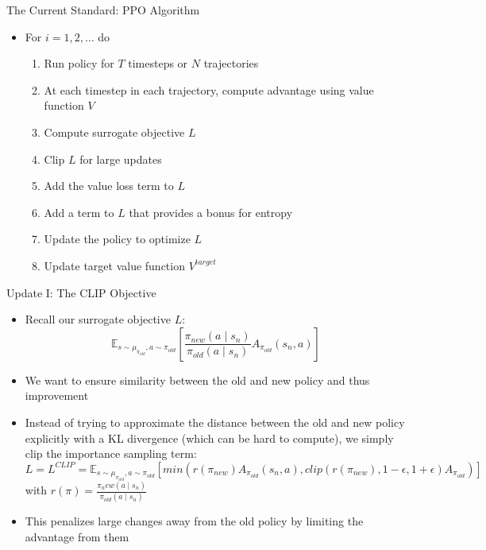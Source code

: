 \documentclass[aspectratio=169]{../latex_main/tntbeamer}  %
\begin{document}
\begin{frame}[c]{The Current Standard: PPO Algorithm~}

	\begin{itemize}
	    \item For $i= 1,2,\ldots$ do
	    \begin{enumerate}
	        \item Run policy for $T$ timesteps or $N$ trajectories
            \item At each timestep in each trajectory, \alert{compute advantage using value function $V$}
	        \item Compute surrogate objective $L$
            \item \alert{Clip $L$} for large updates 
            \item Add the \alert{value loss} term to $L$ 
            \item Add a term to $L$ that provides a \alert{bonus for entropy}
            \item Update the policy to optimize $L$
            \item \alert{Update target value function $V^{target}$}
	    \end{enumerate}
	\end{itemize}

\end{frame}
\begin{frame}[c]{Update I: The CLIP Objective}

	\begin{itemize}
	    \item Recall our surrogate objective $L$:
     $$\mathbb{E}_{s\sim \mu_{\pi_{old}}, a \sim \pi_{old}} \left[ \frac{\pi_{new}(a \mid s_n)}{\pi_{old}(a\mid s_n)} A_{\pi_{old}} (s_n, a) \right]$$
        \item We want to ensure similarity between the old and new policy and thus improvement
        \item Instead of trying to approximate the distance between the old and new policy explicitly with a KL divergence (which can be hard to compute), we simply clip the importance sampling term:
        $$L = L^{CLIP} = \mathbb{E}_{s\sim \mu_{\pi_{old}}, a \sim \pi_{old}} \left[ min( r(\pi_{new}) A_{\pi_{old}} (s_n, a), clip(r(\pi_{new}), 1-\epsilon, 1+\epsilon) A_{\pi_{old}} ) \right]$$
        with $r(\pi) = \frac{\pi_new(a \mid s_n)}{\pi_{old}(a\mid s_n)}$
        \item This penalizes large changes away from the old policy by limiting the advantage from them
	\end{itemize}

\end{frame}
\end{document}
